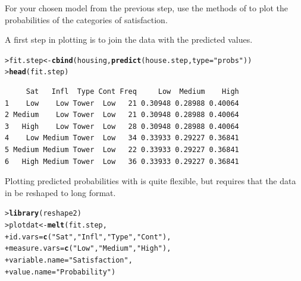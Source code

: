\documentclass[10pt]{report}\usepackage[]{graphicx}\usepackage[]{color}
\makeatletter
\newcommand{\hlstr}[1]{\textcolor[rgb]{0.192,0.494,0.8}{#1}}%
\newcommand{\hlstd}[1]{\textcolor[rgb]{0.345,0.345,0.345}{#1}}%
\newcommand{\hlkwb}[1]{\textcolor[rgb]{0.69,0.353,0.396}{#1}}%
\newcommand{\hlkwc}[1]{\textcolor[rgb]{0.333,0.667,0.333}{#1}}%
\newcommand{\hlkwd}[1]{\textcolor[rgb]{0.737,0.353,0.396}{\textbf{#1}}}%
\newenvironment{kframe}{%
 \def\at@end@of@kframe{}%
 \ifinner\ifhmode%
  \def\at@end@of@kframe{\end{minipage}}%
  \begin{minipage}{\columnwidth}%
 \fi\fi%
 \def\FrameCommand##1{\hskip\@totalleftmargin \hskip-\fboxsep
 \colorbox{shadecolor}{##1}\hskip-\fboxsep
     \hskip-\linewidth \hskip-\@totalleftmargin \hskip\columnwidth}%
 \MakeFramed {\advance\hsize-\width
   \@totalleftmargin\z@ \linewidth\hsize
   \@setminipage}}%
 {\par\unskip\endMakeFramed%
 \at@end@of@kframe}
\newenvironment{knitrout}{}{} %
\renewenvironment{knitrout}{\small\renewcommand{\baselinestretch}{.85}}{} %
\makeatother
\begin{document}
\begin{Exercises}
\begin{enumerate*}
    \item For your chosen model from the previous step, use the methods of
     to plot the probabilities of the categories of
    satisfaction.
    \begin{ans}
    A first step in plotting is to join the data with the predicted values.
\begin{knitrout}\footnotesize
{}\color{fgcolor}\begin{kframe}
\begin{alltt}
\hlstd{> }\hlstd{fit.step} \hlkwb{<-} \hlkwd{cbind}\hlstd{(housing,} \hlkwd{predict}\hlstd{(house.step,} \hlkwc{type}\hlstd{=}\hlstr{"probs"}\hlstd{))}
\hlstd{> }\hlkwd{head}\hlstd{(fit.step)}
\end{alltt}
\begin{verbatim}
     Sat   Infl  Type Cont Freq     Low  Medium    High
1    Low    Low Tower  Low   21 0.30948 0.28988 0.40064
2 Medium    Low Tower  Low   21 0.30948 0.28988 0.40064
3   High    Low Tower  Low   28 0.30948 0.28988 0.40064
4    Low Medium Tower  Low   34 0.33933 0.29227 0.36841
5 Medium Medium Tower  Low   22 0.33933 0.29227 0.36841
6   High Medium Tower  Low   36 0.33933 0.29227 0.36841
\end{verbatim}
\end{kframe}
\end{knitrout}
    Plotting predicted probabilities with  is quite flexible, but
    requires that the data in  be reshaped to long format.
\begin{knitrout}\footnotesize
{}\color{fgcolor}\begin{kframe}
\begin{alltt}
\hlstd{> }\hlkwd{library}\hlstd{(reshape2)}
\hlstd{> }\hlstd{plotdat} \hlkwb{<-} \hlkwd{melt}\hlstd{(fit.step,}
\hlstd{+ }                \hlkwc{id.vars} \hlstd{=} \hlkwd{c}\hlstd{(}\hlstr{"Sat"}\hlstd{,} \hlstr{"Infl"}\hlstd{,} \hlstr{"Type"}\hlstd{,} \hlstr{"Cont"}\hlstd{),}
\hlstd{+ }                \hlkwc{measure.vars} \hlstd{=} \hlkwd{c}\hlstd{(}\hlstr{"Low"}\hlstd{,} \hlstr{"Medium"}\hlstd{,} \hlstr{"High"}\hlstd{),}
\hlstd{+ }                \hlkwc{variable.name} \hlstd{=} \hlstr{"Satisfaction"}\hlstd{,}
\hlstd{+ }                \hlkwc{value.name} \hlstd{=} \hlstr{"Probability"}\hlstd{)}
\end{alltt}
\end{kframe}
\end{knitrout}

\end{ans}
\end{enumerate*}
\end{Exercises}
\end{document}
